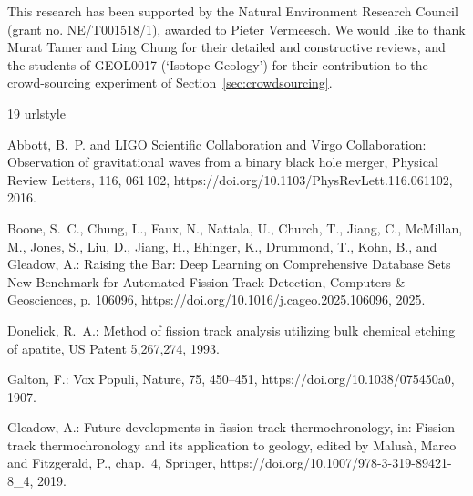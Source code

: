 \documentclass[gchron, manuscript]{copernicus}
\begin{document}

\begin{acknowledgements}
This research has been supported by the Natural Environment Research
Council (grant no. NE/T001518/1), awarded to Pieter Vermeesch. We
would like to thank Murat Tamer and Ling Chung for their detailed and
constructive reviews, and the students of GEOL0017 (`Isotope Geology')
for their contribution to the crowd-sourcing experiment of
Section~\ref{sec:crowdsourcing}.
\end{acknowledgements}

\begin{thebibliography}{19}
\providecommand{\natexlab}[1]{#1}
\providecommand{\url}[1]{\texttt{#1}}
\providecommand{\urlprefix}{}
\expandafter\ifx\csname urlstyle\endcsname\relax
  \providecommand{\doi}[1]{https://doi.org/\discretionary{}{}{}#1}\else
  \providecommand{\doi}{https://doi.org/\discretionary{}{}{}\begingroup
  \urlstyle{rm}\Url}\fi

Abbott, B.~P. and {LIGO Scientific Collaboration and Virgo Collaboration}:
  Observation of gravitational waves from a binary black hole merger, {Physical
  Review Letters}, 116, 061\,102, \doi{10.1103/PhysRevLett.116.061102}, 2016.

Boone, S.~C., Chung, L., Faux, N., Nattala, U., Church, T., Jiang, C.,
  McMillan, M., Jones, S., Liu, D., Jiang, H., Ehinger, K., Drummond, T., Kohn,
  B., and Gleadow, A.: Raising the Bar: Deep Learning on Comprehensive Database
  Sets New Benchmark for Automated Fission-Track Detection, Computers \&
  Geosciences, p. 106096, \doi{10.1016/j.cageo.2025.106096}, 2025.

Donelick, R.~A.: Method of fission track analysis utilizing bulk chemical
  etching of apatite, {US Patent 5,267,274}, 1993.

Galton, F.: Vox Populi, Nature, 75, 450--451, \doi{10.1038/075450a0}, 1907.

Gleadow, A.: {Future developments in fission track thermochronology}, in:
  {Fission track thermochronology and its application to geology}, edited by
  {Malus\`{a}, Marco and Fitzgerald, P.}, chap.~4, {Springer},
  \doi{10.1007/978-3-319-89421-8_4}, 2019.


\end{thebibliography}
\end{document}
